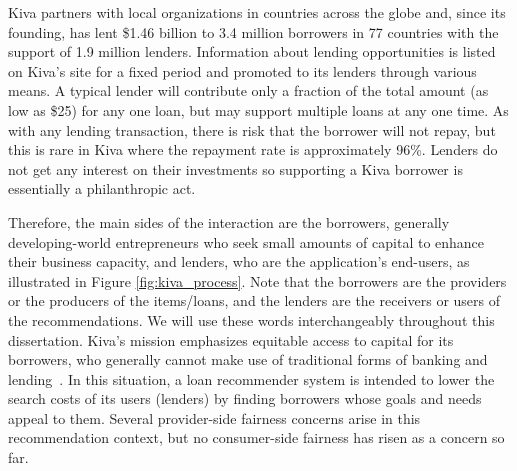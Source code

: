    
    
    Kiva partners with local organizations in countries across the globe and, since its founding, has lent \$1.46 billion to 3.4 million borrowers in 77 countries with the support of 1.9 million lenders. Information about lending opportunities is listed on Kiva's site for a fixed period and promoted to its lenders through various means. A typical lender will contribute only a fraction of the total amount (as low as \$25) for any one loan, but may support multiple loans at any one time. As with any lending transaction, there is risk that the borrower will not repay, but this is rare in Kiva where the repayment rate is approximately 96\%. Lenders do not get any interest on their investments so supporting a Kiva borrower is essentially a philanthropic act.

    Therefore, the main sides of the interaction are the borrowers, generally developing-world entrepreneurs who seek small amounts of capital to enhance their business capacity, and lenders, who are the application's end-users, as illustrated in Figure \ref{fig:kiva_process}. Note that the borrowers are the providers or the producers of the items/loans, and the lenders are the receivers or users of the recommendations. We will use these words interchangeably throughout this dissertation. Kiva's mission emphasizes equitable access to capital for its borrowers, who generally cannot make use of traditional forms of banking and lending~\cite{Choo_understanding_kiva}. In this situation, a loan recommender system is intended to lower the search costs of its users (lenders) by finding borrowers whose goals and needs appeal to them. Several provider-side fairness concerns arise in this recommendation context, but no consumer-side fairness has risen as a concern so far.
    
